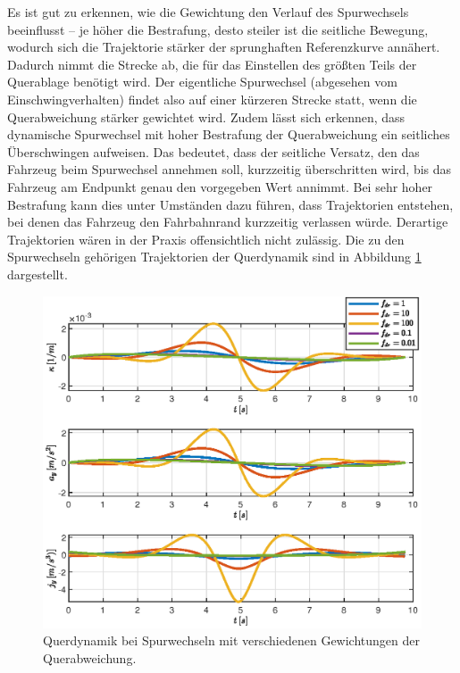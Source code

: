 Es ist gut zu erkennen, wie die Gewichtung den Verlauf des Spurwechsels beeinflusst -- je höher die Bestrafung, desto steiler ist die seitliche Bewegung, wodurch sich die Trajektorie stärker der sprunghaften Referenzkurve annähert. Dadurch nimmt die Strecke ab, die für das Einstellen des größten Teils der Querablage benötigt wird. Der eigentliche Spurwechsel (abgesehen vom Einschwingverhalten) findet also auf einer kürzeren Strecke statt, wenn die Querabweichung stärker gewichtet wird. Zudem lässt sich erkennen, dass dynamische Spurwechsel mit hoher Bestrafung der Querabweichung ein seitliches Überschwingen aufweisen. Das bedeutet, dass der seitliche Versatz, den das Fahrzeug beim Spurwechsel annehmen soll, kurzzeitig überschritten wird, bis das Fahrzeug am Endpunkt genau den vorgegeben Wert annimmt. Bei sehr hoher Bestrafung kann dies unter Umständen dazu führen, dass Trajektorien entstehen, bei denen das Fahrzeug den Fahrbahnrand kurzzeitig verlassen würde. Derartige Trajektorien wären in der Praxis offensichtlich nicht zulässig. Die zu den Spurwechseln gehörigen Trajektorien der Querdynamik sind in Abbildung \ref{fig:lat_dyn_fdr_var} dargestellt.
\begin{figure}[h] 
	\centering
	\includegraphics[width=\linewidth]{./Bilder/Ergebnisse/Geradeausfahrt/Spurwechsel/fdr_var/lat_dyn_ohne_kappa.eps}
	\caption{Querdynamik bei Spurwechseln mit verschiedenen Gewichtungen der Querabweichung.}
	\label{fig:lat_dyn_fdr_var}
\end{figure} 
